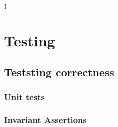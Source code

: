 I%

\chapter{Testing} %

\label{Testing} %



\section{Teststing correctness}

\subsection{Unit tests}

\subsection{Invariant Assertions}



